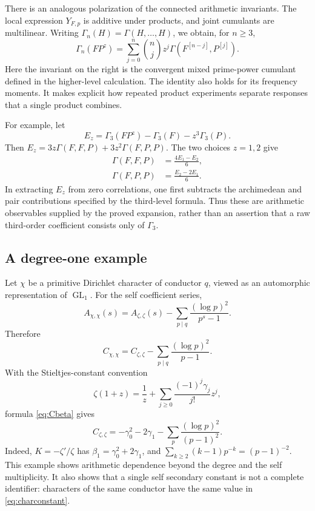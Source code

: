 \documentclass[11pt]{article}
\numberwithin{equation}{section}
\theoremstyle{remark}
\newcommand{\GL}{\operatorname{GL}}
\begin{document}
There is an analogous polarization of the connected arithmetic
invariants.  The local expression $Y_{F,p}$ is additive under products,
and joint cumulants are multilinear.  Writing $\Gamma_n(H)=\Gamma(H,\ldots,H)$, we obtain, for $n\ge3$,
\begin{equation}\label{eq:probe-connected}
 \Gamma_n(FP^z)=\sum_{j=0}^n\binom nj z^j
       \Gamma(F^{[n-j]},P^{[j]}).
\end{equation}
Here the invariant on the right is the convergent mixed prime-power
cumulant defined in the higher-level calculation.  The identity also
holds for its frequency moments.  It makes explicit how repeated
product experiments separate responses that a single product combines.

For example, let
\[
 E_z=\Gamma_3(FP^z)-\Gamma_3(F)-z^3\Gamma_3(P).
\]
Then $E_z=3z\Gamma(F,F,P)+3z^2\Gamma(F,P,P)$.  The two choices $z=1,2$
give
\begin{align}
 \Gamma(F,F,P)&=\frac{4E_1-E_2}{6},\label{eq:probe-cubic-FFP}\\
 \Gamma(F,P,P)&=\frac{E_2-2E_1}{6}.\label{eq:probe-cubic-FPP}
\end{align}
In extracting $E_z$ from zero correlations, one first subtracts the
archimedean and pair contributions specified by the third-level
formula.  Thus these are arithmetic observables supplied by the proved
expansion, rather than an assertion that a raw third-order coefficient
consists only of $\Gamma_3$.

\subsection{A degree-one example}

Let $\chi$ be a primitive Dirichlet character of conductor $q$, viewed
as an automorphic representation of $\GL_1$. For the self coefficient
series,
\[
 A_{\chi,\chi}(s)
 =A_{\zeta,\zeta}(s)-\sum_{p\mid q}\frac{(\log p)^2}{p^s-1}.
\]
Therefore
\begin{equation}\label{eq:charconstant}
 C_{\chi,\chi}=C_{\zeta,\zeta}
                 -\sum_{p\mid q}\frac{(\log p)^2}{p-1}.
\end{equation}
With the Stieltjes-constant convention
\[
 \zeta(1+z)=\frac1z+\sum_{j\geq0}\frac{(-1)^j\gamma_j}{j!}z^j,
\]
formula \eqref{eq:Cbeta} gives
\begin{equation}\label{eq:zetaconstant}
 C_{\zeta,\zeta}=-\gamma_0^2-2\gamma_1
                   -\sum_p\frac{(\log p)^2}{(p-1)^2}.
\end{equation}
Indeed, $K=-\zeta'/\zeta$ has
$\beta_1=\gamma_0^2+2\gamma_1$, and
$\sum_{k\geq2}(k-1)p^{-k}=(p-1)^{-2}$.
This example shows arithmetic dependence beyond the degree and the
self multiplicity. It also shows that a single self secondary constant
is not a complete identifier: characters of the same conductor have
the same value in \eqref{eq:charconstant}.
\end{document}
